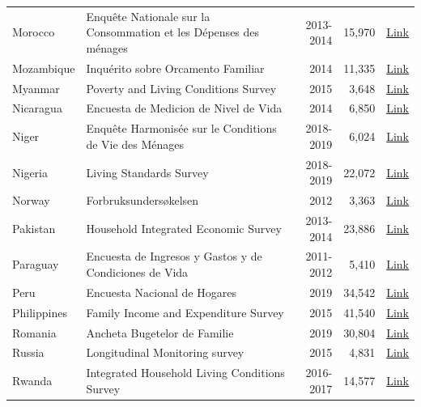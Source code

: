 \begin{ThreePartTable}
\begin{longtable}[t]{l|p{8cm}|r|r|c}
        Morocco & Enquête Nationale sur la Consommation et les Dépenses des ménages & 2013-2014 &  15,970  & \href{https://www.hcp.ma/Enquete-nationale-sur-la-consommation-et-les-depenses-des-menages\_a95.html}{Link} \\ 
        Mozambique & Inquérito sobre Orcamento Familiar & 2014 & 11,335 & \href{https://catalog.ihsn.org/catalog/7340/data-dictionary/F66}{Link} \\
        Myanmar & Poverty and Living Conditions Survey & 2015 &  3,648  & \href{http://hdl.handle.net/10986/29037}{Link} \\ 
        Nicaragua & Encuesta de Medicion de Nivel de Vida & 2014 &  6,850  & \href{https://www.inide.gob.ni/Home/enmv}{Link} \\ 
        Niger & Enquête Harmonisée sur le Conditions de Vie des Ménages & 2018-2019 &  6,024  & \href{https://microdata.worldbank.org/index.php/catalog/4296}{Link} \\ 
        Nigeria & Living Standards Survey & 2018-2019 &  22,072  & \href{https://microdata.worldbank.org/index.php/catalog/5835}{Link} \\ 
        Norway & Forbruksundersøkelsen & 2012 &  3,363  & \href{https://www.ssb.no/inntekt-og-forbruk/artikler-og-publikasjoner/forbruksundersokelsen-2012}{Link} \\ 
        Pakistan & Household Integrated Economic Survey & 2013-2014 &  23,886  & \href{https://www.pbs.gov.pk/publication/household-integrated-economic-survey-hies-2018-19}{Link} \\ 
        Paraguay & Encuesta de Ingresos y Gastos y de Condiciones de Vida & 2011-2012 &  5,410  & \href{https://www.ine.gov.py/microdatos/microdatos.php}{Link} \\ 
        Peru & Encuesta Nacional de Hogares & 2019 &  34,542  & \href{https://www.datosabiertos.gob.pe/dataset/encuesta-nacional-de-hogares-enaho-2019-instituto-nacional-de-estad\%C3\%ADstica-e-inform\%C3\%A1tica-inei}{Link} \\ 
        Philippines & Family Income and Expenditure Survey & 2015 &  41,540  & \href{https://rssoncr.psa.gov.ph/fies}{Link} \\ 
        Romania & Ancheta Bugetelor de Familie & 2019 & 30,804 & \href{https://insse.ro/cms/ro/content/rapoarte-de-calitate-anchete-statistice}{Link} \\
        Russia & Longitudinal Monitoring survey & 2015 &  4,831  & \href{https://www.hse.ru/en/rlms/availability }{Link} \\ 
        Rwanda & Integrated Household Living Conditions Survey & 2016-2017 &  14,577  & \href{https://www.statistics.gov.rw/datasource/integrated-household-living-conditions-survey-eicv}{Link} \\ 

\end{longtable}
\end{ThreePartTable}
